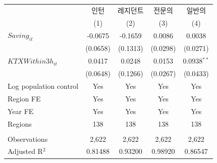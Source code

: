 \begingroup
\centering
\begin{tabular}{lcccc}
   \toprule
                          & 인턴     & 레지던트 & 전문의   & 일반의 \\   
                          & (1)      & (2)      & (3)      & (4)\\  
   \midrule 
   $Saving_{it}$          & -0.0675  & -0.1659  & 0.0086   & 0.0038\\   
                          & (0.0658) & (0.1313) & (0.0298) & (0.0271)\\   
   $KTXWithin3h_{it}$     & 0.0417   & 0.0248   & 0.0153   & 0.0938$^{**}$\\   
                          & (0.0648) & (0.1266) & (0.0267) & (0.0433)\\   
   Log population control & Yes      & Yes      & Yes      & Yes\\  
   Region FE              & Yes      & Yes      & Yes      & Yes\\  
   Year FE                & Yes      & Yes      & Yes      & Yes\\  
   Regions                & 138      & 138      & 138      & 138\\  
    \\
   Observations           & 2,622    & 2,622    & 2,622    & 2,622\\  
   Adjusted R$^2$         & 0.81488  & 0.93200  & 0.98920  & 0.86547\\  
   \bottomrule
\end{tabular}
\par\endgroup
